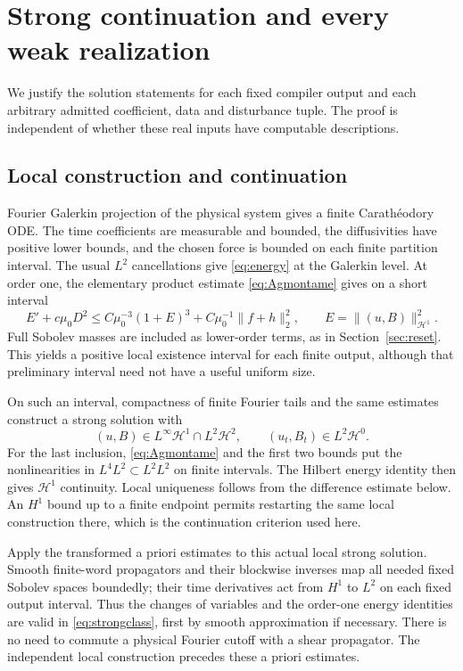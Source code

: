 \documentclass[11pt,a4paper]{amsart}
\theoremstyle{definition}
\theoremstyle{remark}
\numberwithin{equation}{section}
\newcommand{\Hcal}{\mathcal H}
\newcommand{\norm}[1]{\lVert #1\rVert}
\begin{document}
\section{Strong continuation and every weak realization}\label{sec:weak}
We justify the solution statements for each fixed compiler output and each arbitrary admitted coefficient, data and disturbance tuple. The proof is independent of whether these real inputs have computable descriptions.

\subsection{Local construction and continuation}
Fourier Galerkin projection of the physical system gives a finite Carath\'eodory ODE. The time coefficients are measurable and bounded, the diffusivities have positive lower bounds, and the chosen force is bounded on each finite partition interval. The usual $L^2$ cancellations give \eqref{eq:energy} at the Galerkin level. At order one, the elementary product estimate \eqref{eq:Agmontame} gives on a short interval
\[
 E'+c\mu_0D^2\le C\mu_0^{-3}(1+E)^3+C\mu_0^{-1}\norm{f+h}_2^2,
 \qquad E=\norm{(u,B)}_{\Hcal^1}^2.
\]
Full Sobolev masses are included as lower-order terms, as in Section~\ref{sec:reset}. This yields a positive local existence interval for each finite output, although that preliminary interval need not have a useful uniform size.

On such an interval, compactness of finite Fourier tails and the same estimates construct a strong solution with
\begin{equation}\label{eq:strongclass}
 (u,B)\in L^\infty\Hcal^1\cap L^2\Hcal^2,
 \qquad (u_t,B_t)\in L^2\Hcal^0.
\end{equation}
For the last inclusion, \eqref{eq:Agmontame} and the first two bounds put the nonlinearities in $L^4L^2\subset L^2L^2$ on finite intervals. The Hilbert energy identity then gives $\Hcal^1$ continuity. Local uniqueness follows from the difference estimate below. An $H^1$ bound up to a finite endpoint permits restarting the same local construction there, which is the continuation criterion used here.

Apply the transformed a priori estimates to this actual local strong solution. Smooth finite-word propagators and their blockwise inverses map all needed fixed Sobolev spaces boundedly; their time derivatives act from $H^1$ to $L^2$ on each fixed output interval. Thus the changes of variables and the order-one energy identities are valid in \eqref{eq:strongclass}, first by smooth approximation if necessary. There is no need to commute a physical Fourier cutoff with a shear propagator. The independent local construction precedes these a priori estimates.
\end{document}
